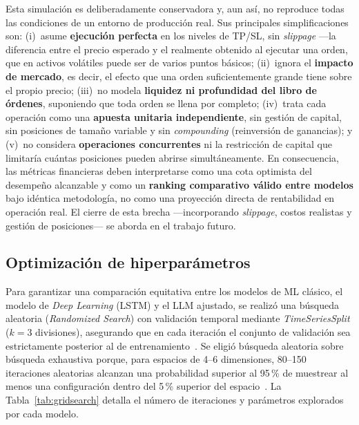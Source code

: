 \documentclass[10pt,twocolumn]{article}
\begin{document}
Esta simulaci\'on es deliberadamente conservadora y, aun as\'i, no reproduce todas las condiciones de un entorno de producci\'on real. Sus principales simplificaciones son: (i)~asume \textbf{ejecuci\'on perfecta} en los niveles de TP/SL, sin \textit{slippage} ---la diferencia entre el precio esperado y el realmente obtenido al ejecutar una orden, que en activos vol\'atiles puede ser de varios puntos b\'asicos; (ii)~ignora el \textbf{impacto de mercado}, es decir, el efecto que una orden suficientemente grande tiene sobre el propio precio; (iii)~no modela \textbf{liquidez ni profundidad del libro de \'ordenes}, suponiendo que toda orden se llena por completo; (iv)~trata cada operaci\'on como una \textbf{apuesta unitaria independiente}, sin gesti\'on de capital, sin posiciones de tama\~no variable y sin \textit{compounding} (reinversi\'on de ganancias); y (v)~no considera \textbf{operaciones concurrentes} ni la restricci\'on de capital que limitar\'ia cu\'antas posiciones pueden abrirse simult\'aneamente. En consecuencia, las m\'etricas financieras deben interpretarse como una cota optimista del desempe\~no alcanzable y como un \textbf{ranking comparativo v\'alido entre modelos} bajo id\'entica metodolog\'ia, no como una proyecci\'on directa de rentabilidad en operaci\'on real. El cierre de esta brecha ---incorporando \textit{slippage}, costos realistas y gesti\'on de posiciones--- se aborda en el trabajo futuro.

\subsection{Optimizaci\'on de hiperpar\'ametros}

Para garantizar una comparaci\'on equitativa entre los modelos de ML cl\'asico, el modelo de \textit{Deep Learning} (LSTM) y el LLM ajustado, se realiz\'o una b\'usqueda aleatoria (\textit{Randomized Search}) con validaci\'on temporal mediante \textit{TimeSeriesSplit} ($k=3$ divisiones), asegurando que en cada iteraci\'on el conjunto de validaci\'on sea estrictamente posterior al de entrenamiento~\cite{pardo2008}. Se eligi\'o b\'usqueda aleatoria sobre b\'usqueda exhaustiva porque, para espacios de 4--6 dimensiones, 80--150 iteraciones aleatorias alcanzan una probabilidad superior al 95\,\% de muestrear al menos una configuraci\'on dentro del 5\,\% superior del espacio~\cite{miguelanez2026}. La Tabla~\ref{tab:gridsearch} detalla el n\'umero de iteraciones y par\'ametros explorados por cada modelo.
\end{document}
